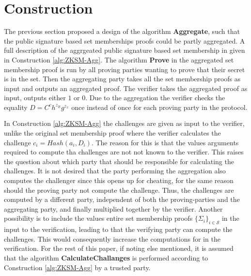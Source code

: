 \section{Construction}
The previous section proposed a design of the algorithm \textbf{Aggregate}, such that the  public signature based set memberships proofs could be partly aggregated. A full description of the aggrgeated public signature based set membership in given in Construction \ref{alg:ZKSM-Agg}. The algorithm \textbf{Prove} in the aggregated set membership proof is run by all proving parties wanting to prove that their secret is in the set. Then the aggregating party takes all the set membership proofs as input and outputs an aggregated proof. The verifier takes the aggregated proof as input, outputs either $1$ or $0$. Due to the aggregation  the verifier checks the equality $D=C^ch^{z_R}g^{z_x}$ once instead of once for each proving party in the protocol. 

In Construction \ref{alg:ZKSM-Agg} the challenges are given as input to the verifier, unlike the original set membership proof where the verifier calculates the challenge $c_i=Hash(a_i,D_i)$. The reason for this is that the values arguments required to compute tha challenges are not not known to the verifier. This raises the question about which party that should be responsible for calculating the challenges.  It is not desired that the party performing the aggregation also computes the challenger since this opens up for cheating, for the same reason should the proving party not compute the challenge. Thus, the challenges are computed by a different party, independent of both the proving-parties and the aggregating party, and finally multiplied together by the verifier. Another possibility is to include the values entire set membership proofs $\{\Sigma_i\}_{i\in\mathcal{S}}$ in the input to the verification, leading to that the verifying party can compute the challenges. This would consequently increase the computations for in the verification. For the rest of this paper, if noting else mentioned, it is assumed that the algorithm \textbf{CalculateChallanges} is performed according to Construction \ref{alg:ZKSM-Agg} by a trusted party. 




